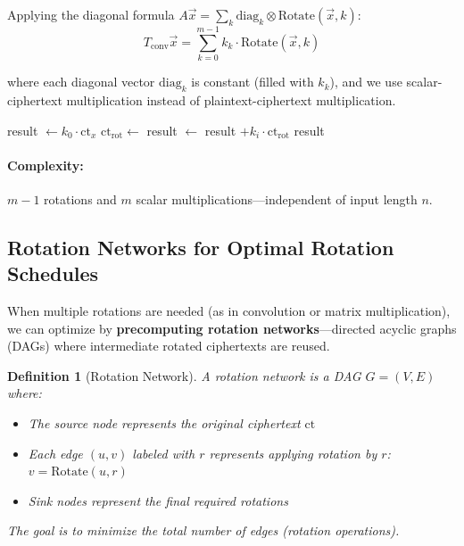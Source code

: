 \documentclass[11pt,a4paper]{article}
\newtheorem{definition}{Definition}
\begin{document}
Applying the diagonal formula $A\vec{x} = \sum_k \text{diag}_k \otimes \text{Rotate}(\vec{x}, k)$:
\[
T_{\text{conv}} \vec{x} = \sum_{k=0}^{m-1} k_k \cdot \text{Rotate}(\vec{x}, k)
\]

where each diagonal vector $\text{diag}_k$ is constant (filled with $k_k$), and we use scalar-ciphertext multiplication instead of plaintext-ciphertext multiplication.

\begin{algorithm}[H]
\caption{1D Convolution via Diagonal Method}
\begin{algorithmic}[1]
    \State {}
    \State result $\gets k_0 \cdot \text{ct}_x$ 
        \State $\text{ct}_{\text{rot}} \gets$ 
        \State result $\gets$ result $+ k_i \cdot \text{ct}_{\text{rot}}$
    \EndFor
    \State \Return result
\EndFunction
\end{algorithmic}
\end{algorithm}

\paragraph{Complexity:} $m-1$ rotations and $m$ scalar multiplications—independent of input length $n$.

\subsection{Rotation Networks for Optimal Rotation Schedules}

When multiple rotations are needed (as in convolution or matrix multiplication), we can optimize by \textbf{precomputing rotation networks}—directed acyclic graphs (DAGs) where intermediate rotated ciphertexts are reused.

\begin{definition}[Rotation Network]
A rotation network is a DAG $G = (V, E)$ where:
\begin{itemize}
    \item The source node represents the original ciphertext $\text{ct}$
    \item Each edge $(u, v)$ labeled with $r$ represents applying rotation by $r$: $v = \text{Rotate}(u, r)$
    \item Sink nodes represent the final required rotations
\end{itemize}
The goal is to minimize the total number of edges (rotation operations).
\end{definition}
\end{document}
